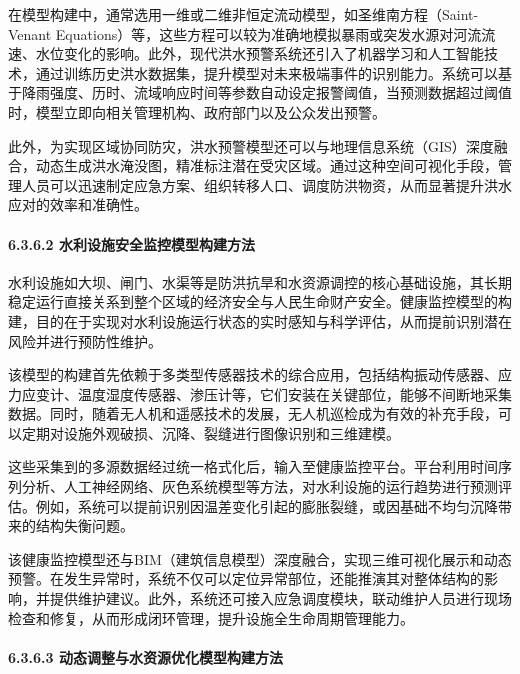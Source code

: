 在模型构建中，通常选用一维或二维非恒定流动模型，如圣维南方程（Saint-Venant Equations）等，这些方程可以较为准确地模拟暴雨或突发水源对河流流速、水位变化的影响。此外，现代洪水预警系统还引入了机器学习和人工智能技术，通过训练历史洪水数据集，提升模型对未来极端事件的识别能力。系统可以基于降雨强度、历时、流域响应时间等参数自动设定报警阈值，当预测数据超过阈值时，模型立即向相关管理机构、政府部门以及公众发出预警。

此外，为实现区域协同防灾，洪水预警模型还可以与地理信息系统（GIS）深度融合，动态生成洪水淹没图，精准标注潜在受灾区域。通过这种空间可视化手段，管理人员可以迅速制定应急方案、组织转移人口、调度防洪物资，从而显著提升洪水应对的效率和准确性。

\hypertarget{ux6c34ux5229ux8bbeux65bdux5b89ux5168ux76d1ux63a7ux6a21ux578bux6784ux5efaux65b9ux6cd5}{%
\paragraph{6.3.6.2 水利设施安全监控模型构建方法}\label{ux6c34ux5229ux8bbeux65bdux5b89ux5168ux76d1ux63a7ux6a21ux578bux6784ux5efaux65b9ux6cd5}}

水利设施如大坝、闸门、水渠等是防洪抗旱和水资源调控的核心基础设施，其长期稳定运行直接关系到整个区域的经济安全与人民生命财产安全。健康监控模型的构建，目的在于实现对水利设施运行状态的实时感知与科学评估，从而提前识别潜在风险并进行预防性维护。

该模型的构建首先依赖于多类型传感器技术的综合应用，包括结构振动传感器、应力应变计、温度湿度传感器、渗压计等，它们安装在关键部位，能够不间断地采集数据。同时，随着无人机和遥感技术的发展，无人机巡检成为有效的补充手段，可以定期对设施外观破损、沉降、裂缝进行图像识别和三维建模。

这些采集到的多源数据经过统一格式化后，输入至健康监控平台。平台利用时间序列分析、人工神经网络、灰色系统模型等方法，对水利设施的运行趋势进行预测评估。例如，系统可以提前识别因温差变化引起的膨胀裂缝，或因基础不均匀沉降带来的结构失衡问题。

该健康监控模型还与BIM（建筑信息模型）深度融合，实现三维可视化展示和动态预警。在发生异常时，系统不仅可以定位异常部位，还能推演其对整体结构的影响，并提供维护建议。此外，系统还可接入应急调度模块，联动维护人员进行现场检查和修复，从而形成闭环管理，提升设施全生命周期管理能力。

\hypertarget{ux52a8ux6001ux8c03ux6574ux4e0eux6c34ux8d44ux6e90ux4f18ux5316ux6a21ux578bux6784ux5efaux65b9ux6cd5}{%
\paragraph{6.3.6.3 动态调整与水资源优化模型构建方法}\label{ux52a8ux6001ux8c03ux6574ux4e0eux6c34ux8d44ux6e90ux4f18ux5316ux6a21ux578bux6784ux5efaux65b9ux6cd5}}

